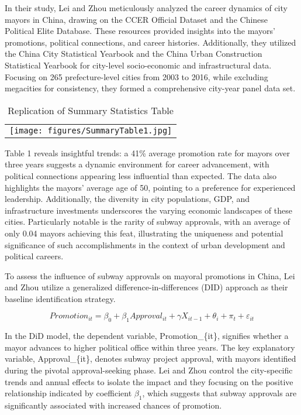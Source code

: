 \documentclass[12pt, ]{article}
\begin{document}
In their study, Lei and Zhou meticulously analyzed the career dynamics
of city mayors in China, drawing on the CCER Official Dataset and the
Chinese Political Elite Database. These resources provided insights into
the mayors' promotions, political connections, and career histories.
Additionally, they utilized the China City Statistical Yearbook and the
China Urban Construction Statistical Yearbook for city-level
socio-economic and infrastructural data. Focusing on 265
prefecture-level cities from 2003 to 2016, while excluding megacities
for consistency, they formed a comprehensive city-year panel data set.

\hypertarget{tbl-main}{}
\begin{longtable}[]{@{}l@{}}
\caption{\label{tbl-main}Replication of \citet{lei2022private} Summary
Statistics Table}\tabularnewline
\toprule\noalign{}
\endfirsthead
\endhead
\bottomrule\noalign{}
\endlastfoot
\texttt{[image: figures/SummaryTable1.jpg]} \\
\end{longtable}

Table 1 reveals insightful trends: a 41\% average promotion rate for
mayors over three years suggests a dynamic environment for career
advancement, with political connections appearing less influential than
expected. The data also highlights the mayors' average age of 50,
pointing to a preference for experienced leadership. Additionally, the
diversity in city populations, GDP, and infrastructure investments
underscores the varying economic landscapes of these cities.
Particularly notable is the rarity of subway approvals, with an average
of only 0.04 mayors achieving this feat, illustrating the uniqueness and
potential significance of such accomplishments in the context of urban
development and political careers.

To assess the influence of subway approvals on mayoral promotions in
China, Lei and Zhou utilize a generalized difference-in-differences
(DID) approach as their baseline identification strategy.

\[Promotion_{it} = \beta_0 + \beta_1 Approval_{it} + \gamma X_{it-1} + \theta_i + \pi_t + \varepsilon_{it}\]

In the DiD model, the dependent variable, Promotion\_\{it\}, signifies
whether a mayor advances to higher political office within three years.
The key explanatory variable, Approval\_\{it\}, denotes subway project
approval, with mayors identified during the pivotal approval-seeking
phase. Lei and Zhou control the city-specific trends and annual effects
to isolate the impact and they focusing on the positive relationship
indicated by coefficient \(\beta_1\), which suggests that subway
approvals are significantly associated with increased chances of
promotion.
\end{document}
